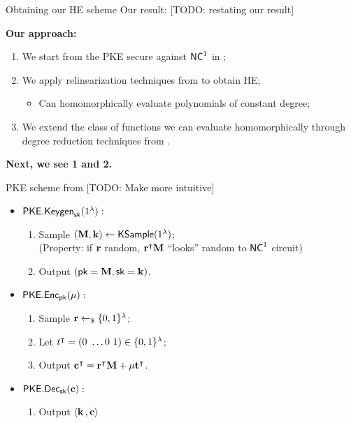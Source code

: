 \begin{frame}{Obtaining our HE scheme}
	Our result: [TODO: restating our result]
	
	\textbf{Our approach:}
	\begin{enumerate}
		\item We start from the PKE secure against ${\mathsf{NC}}^1$ in \cite{fgcrypto};
		\item We apply relinearization techniques from \cite{fhe-lwe} to obtain HE;
		\begin{itemize}
			\item Can homomorphically evaluate polynomials of constant degree; 
		\end{itemize}
		\item We extend the class of functions we can evaluate homomorphically through degree reduction techniques from \cite{razborov1987lower}.
	\end{enumerate}\pause
	\textbf{Next, we see 1 and 2.}
\end{frame}

\begin{frame}{PKE scheme from \cite{fgcrypto}}
	[TODO: Make more intuitive]
	\begin{itemize}
		\item $\mathsf{PKE.Keygen}_{\mathsf{sk}}(1^{\lambda}):$
		\begin{enumerate}
			\item Sample $(\mathbf{M}, \mathbf{k}) \gets \mathsf{KSample}(1^{\lambda})$;\\
			 {\color{red}(Property: if $\mathbf{r}$ random, ${\mathbf{r}}^{\intercal}  \mathbf{M}$ ``looks'' random to ${\mathsf{NC}}^1$ circuit)}
			\item Output $(\mathsf{pk} = \mathbf{M}, \mathsf{sk} = \mathbf{k})$.
		\end{enumerate}
		\pause
		\item $\mathsf{PKE.Enc}_{\mathsf{pk}}(\mu):$
		\begin{enumerate}
			\item Sample $\mathbf{r} \leftarrow_{\$} \{0, 1\}^{\lambda}$;
			\item Let ${t}^{\intercal} = (0 \ \dots 0 \ 1) \in \{0, 1\}^{\lambda}$;
			\item Output ${\mathbf{c}}^{\intercal} = {\mathbf{r}}^{\intercal}  \mathbf{M} + \mu{\mathbf{t}}^{\intercal}$.
		\end{enumerate}
		\pause
		\item $\mathsf{PKE.Dec}_{\mathsf{sk}}(\mathbf{c}):$
		\begin{enumerate}
			\item Output $\langle \mathbf{k} \, , \mathbf{c} \rangle$
		\end{enumerate}
		
	\end{itemize}
\end{frame}

